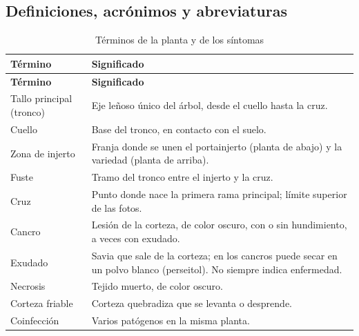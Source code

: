 \documentclass[11pt]{article}
\begin{document}
\subsection{Definiciones, acrónimos y abreviaturas}
{\small
\begin{longtable}{|>{\RaggedRight\arraybackslash}p{3.91cm}|>{\RaggedRight\arraybackslash}p{10.95cm}|}
\caption{Términos de la planta y de los síntomas}\\
\hline
\rowcolor{encabezado}\textbf{Término} & \textbf{Significado} \\ \hline
\endfirsthead
\hline
\rowcolor{encabezado}\textbf{Término} & \textbf{Significado} \\ \hline
\endhead
Tallo principal (tronco) & Eje leñoso único del árbol, desde el cuello hasta la cruz. \\ \hline
Cuello & Base del tronco, en contacto con el suelo. \\ \hline
Zona de injerto & Franja donde se unen el portainjerto (planta de abajo) y la variedad (planta de arriba). \\ \hline
Fuste & Tramo del tronco entre el injerto y la cruz. \\ \hline
Cruz & Punto donde nace la primera rama principal; límite superior de las fotos. \\ \hline
Cancro & Lesión de la corteza, de color oscuro, con o sin hundimiento, a veces con exudado. \\ \hline
Exudado & Savia que sale de la corteza; en los cancros puede secar en un polvo blanco (perseitol). No siempre indica enfermedad. \\ \hline
Necrosis & Tejido muerto, de color oscuro. \\ \hline
Corteza friable & Corteza quebradiza que se levanta o desprende. \\ \hline
Coinfección & Varios patógenos en la misma planta. \\ \hline
\end{longtable}}
\end{document}
